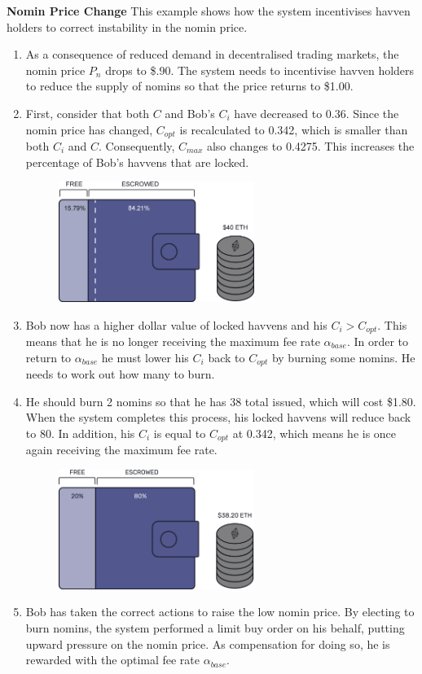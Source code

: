 \noindent \textbf{Nomin Price Change} This example shows how the system incentivises havven holders to correct instability in the nomin price.

\begin{enumerate}
\item{As a consequence of reduced demand in decentralised trading markets, the nomin price $P_n$ drops to \$.90. The system needs to incentivise havven holders to reduce the supply of nomins so that the price returns to \$1.00.}
\item{First, consider that both $C$ and Bob's $C_i$ have decreased to 0.36. Since the nomin price has changed, $C_{opt}$ is recalculated to 0.342, which is smaller than both $C_i$ and $C$. Consequently, $C_{max}$ also changes to 0.4275. This increases the percentage of Bob's havvens that are locked.}
\begin{figure}[h!]
\centering
    \includegraphics[width=0.6\textwidth]{img/pn_drop}
\end{figure}
\item{Bob now has a higher dollar value of locked havvens and his $C_i > C_{opt}$. This means that he is no longer receiving the maximum fee rate $\alpha_{base}$. In order to return to $\alpha_{base}$ he must lower his $C_i$ back to $C_{opt}$ by burning some nomins. He needs to work out how many to burn.}
\item{He should burn 2 nomins so that he has 38 total issued, which will cost \$1.80. When the system completes this process, his locked havvens will reduce back to 80. In addition, his $C_i$ is equal to $C_{opt}$ at 0.342, which means he is once again receiving the maximum fee rate.}
\begin{figure}[h!]
\centering
    \includegraphics[width=0.6\textwidth]{img/post_burn}
\end{figure}
\item{Bob has taken the correct actions to raise the low nomin price. By electing to burn nomins, the system performed a limit buy order on his behalf, putting upward pressure on the nomin price. As compensation for doing so, he is rewarded with the optimal fee rate $\alpha_{base}$.}
\end{enumerate}

